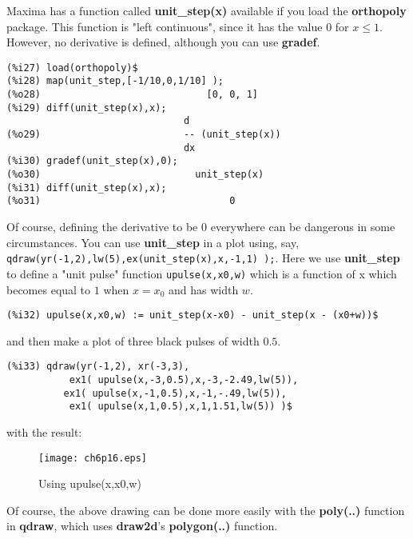 \documentclass[12pt]{article}
\begin{document}
\smallskip
Maxima has a function called \textbf{unit\_step(x)} available if you load
  the \textbf{orthopoly} package.
This function is "left continuous", since it has the value $0$ for $x \leq 1$.
However, no derivative is defined, although you can use \textbf{gradef}.
\small
\begin{verbatim}
(%i27) load(orthopoly)$
(%i28) map(unit_step,[-1/10,0,1/10] );
(%o28)                             [0, 0, 1]
(%i29) diff(unit_step(x),x);
                               d
(%o29)                         -- (unit_step(x))
                               dx
(%i30) gradef(unit_step(x),0);
(%o30)                           unit_step(x)
(%i31) diff(unit_step(x),x);
(%o31)                                 0							   
\end{verbatim}
\normalsize
Of course, defining the derivative to be $0$ everywhere can be dangerous in
  some circumstances.
You can use \textbf{unit\_step} in a plot using, say,
  \verb|qdraw(yr(-1,2),lw(5),ex(unit_step(x),x,-1,1) );|.  
Here we use \textbf{unit\_step} to define a "unit pulse" function
  \verb|upulse(x,x0,w)| which is a function of x which becomes equal to $1$
  when $x = x_0$ and has width $w$.
\small
\begin{verbatim}
(%i32) upulse(x,x0,w) := unit_step(x-x0) - unit_step(x - (x0+w))$
\end{verbatim}
\normalsize
and then make a plot of three black pulses of width $0.5$.
\small
\begin{verbatim}
(%i33) qdraw(yr(-1,2), xr(-3,3), 
           ex1( upulse(x,-3,0.5),x,-3,-2.49,lw(5)),  
          ex1( upulse(x,-1,0.5),x,-1,-.49,lw(5)),
           ex1( upulse(x,1,0.5),x,1,1.51,lw(5)) )$
\end{verbatim}
\normalsize
with the result:
\begin{figure} [h]
   \centerline{\texttt{[image: ch6p16.eps]} }
	\caption{ Using upulse(x,x0,w) }
\end{figure} 

\smallskip
Of course, the above drawing can be done more easily with the \textbf{poly(..)}
  function in \textbf{qdraw}, which uses \textbf{draw2d}'s \textbf{polygon(..)}
  function.
\end{document}
